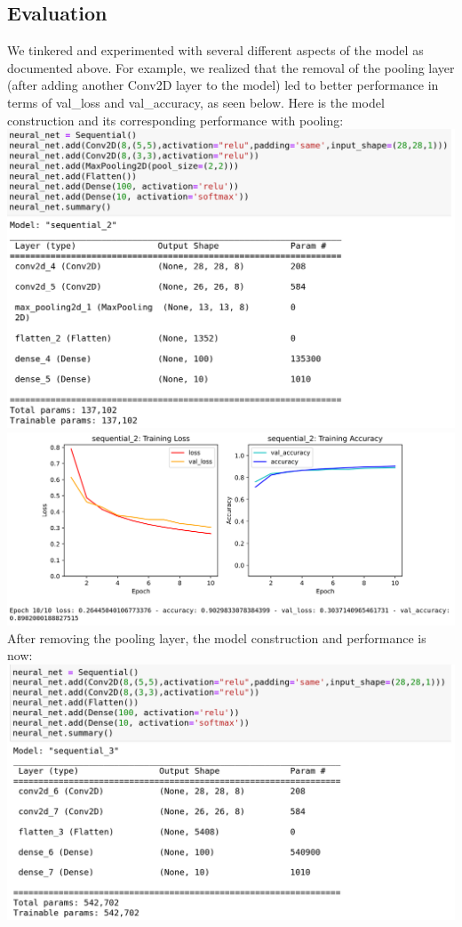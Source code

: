 \documentclass[11pt]{article}
\begin{document}
\begin{center}
\section{Evaluation}



We tinkered and experimented with several different aspects of the model as documented above. For example, we realized that the removal of the pooling layer (after adding another
Conv2D layer to the model) led to better performance in terms of val\_loss and val\_accuracy, as seen below. Here is the model construction and its corresponding performance
with pooling:
\includegraphics[scale=0.25]{W_pooling_construct}
\includegraphics[scale=0.25]{W_pooling_train}
\linebreak
After removing the pooling layer, the model construction and performance is now:
\includegraphics[scale=0.25]{W_o_pooling_construct}

\end{center}
\end{document}
